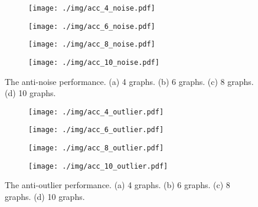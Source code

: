 \begin{figure}[htb!]
    \centering
    \begin{subfigure}{.23\textwidth}
        \centering
        \texttt{[image: ./img/acc\_4\_noise.pdf]}
        \caption{}
        \label{fig:5.1.1}
    \end{subfigure}
    \begin{subfigure}{.23\textwidth}
        \centering
        \texttt{[image: ./img/acc\_6\_noise.pdf]}
        \caption{}
        \label{fig:5.1.2}
    \end{subfigure}
    \begin{subfigure}{.23\textwidth}
        \centering
        \texttt{[image: ./img/acc\_8\_noise.pdf]}
        \caption{}
        \label{fig:5.1.3}
    \end{subfigure}
    \begin{subfigure}{.23\textwidth}
        \centering
        \texttt{[image: ./img/acc\_10\_noise.pdf]}
        \caption{}
        \label{fig:5.1.4}
    \end{subfigure}
    \caption{The anti-noise performance. (a) 4 graphs. (b) 6 graphs. (c) 8 graphs. (d) 10 graphs.}
    \label{fig:5.1}
\end{figure}

\begin{figure}[htb!]
    \centering
    \begin{subfigure}{.23\textwidth}
        \centering
        \texttt{[image: ./img/acc\_4\_outlier.pdf]}
        \caption{}
        \label{fig:5.2.1}
    \end{subfigure}
    \begin{subfigure}{.23\textwidth}
        \centering
        \texttt{[image: ./img/acc\_6\_outlier.pdf]}
        \caption{}
        \label{fig:5.2.2}
    \end{subfigure}
    \begin{subfigure}{.23\textwidth}
        \centering
        \texttt{[image: ./img/acc\_8\_outlier.pdf]}
        \caption{}
        \label{fig:5.2.3}
    \end{subfigure}
    \begin{subfigure}{.23\textwidth}
        \centering
        \texttt{[image: ./img/acc\_10\_outlier.pdf]}
        \caption{}
        \label{fig:5.2.4}
    \end{subfigure}
    \caption{The anti-outlier performance. (a) 4 graphs. (b) 6 graphs. (c) 8 graphs. (d) 10 graphs.}
    \label{fig:5.2}
\end{figure}

